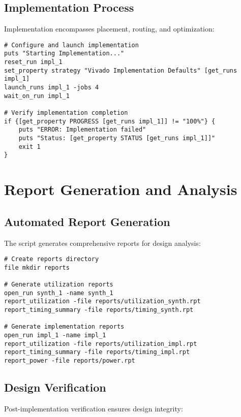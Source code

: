 \subsection{Implementation Process}

Implementation encompasses placement, routing, and optimization:

\begin{lstlisting}[caption=Implementation Execution]
# Configure and launch implementation
puts "Starting Implementation..."
reset_run impl_1
set_property strategy "Vivado Implementation Defaults" [get_runs impl_1]
launch_runs impl_1 -jobs 4
wait_on_run impl_1

# Verify implementation completion
if {[get_property PROGRESS [get_runs impl_1]] != "100%"} {
    puts "ERROR: Implementation failed"
    puts "Status: [get_property STATUS [get_runs impl_1]]"
    exit 1
}
\end{lstlisting}

\section{Report Generation and Analysis}
\label{sec:report_analysis}

\subsection{Automated Report Generation}

The script generates comprehensive reports for design analysis:

\begin{lstlisting}[caption=Report Generation]
# Create reports directory
file mkdir reports

# Generate utilization reports
open_run synth_1 -name synth_1
report_utilization -file reports/utilization_synth.rpt
report_timing_summary -file reports/timing_synth.rpt

# Generate implementation reports
open_run impl_1 -name impl_1
report_utilization -file reports/utilization_impl.rpt
report_timing_summary -file reports/timing_impl.rpt
report_power -file reports/power.rpt
\end{lstlisting}

\subsection{Design Verification}

Post-implementation verification ensures design integrity:

